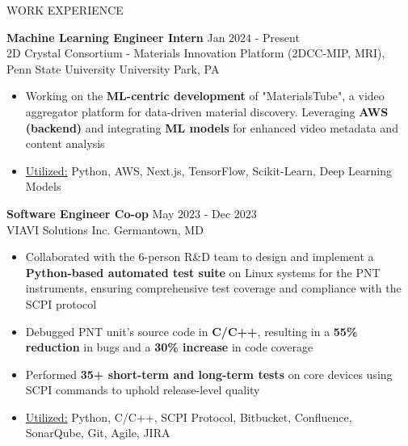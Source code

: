 \documentclass{resume} %
\begin{document}
\begin{rSection}{WORK EXPERIENCE}

{\bf Machine Learning Engineer Intern} \hfill Jan $2024$ - Present\\
2D Crystal Consortium - Materials Innovation Platform (2DCC-MIP, MRI), Penn State University \hfill University Park, PA
\begin{itemize}[itemsep = -4pt]
    \item Working on the {\bf ML-centric development} of "MaterialsTube", a video aggregator platform for data-driven material discovery. Leveraging {\bf AWS (backend)} and integrating {\bf ML models} for enhanced video metadata and content analysis
    \item \underline{Utilized:} Python, AWS, Next.js, TensorFlow, Scikit-Learn, Deep Learning Models 
\end{itemize}

{\bf Software Engineer Co-op} \hfill May $2023$ - Dec $2023$\\
VIAVI Solutions Inc. \hfill Germantown, MD
\begin{itemize}[itemsep = -4pt]
    \item Collaborated with the $6$-person R\&D team to design and implement a {\bf Python-based automated test suite} on Linux systems for the PNT instruments, ensuring comprehensive test coverage and compliance with the SCPI protocol
    \item Debugged PNT unit's source code in {\bf C/C++}, resulting in a {\bf 55\% reduction} in bugs and a {\bf 30\% increase} in code coverage
    \item Performed {\bf 35+ short-term and long-term tests} on core devices using SCPI commands to uphold release-level quality
    \item \underline{Utilized:} Python, C/C++, SCPI Protocol, Bitbucket, Confluence, SonarQube, Git, Agile, JIRA
\end{itemize}


\end{rSection}
\end{document}
